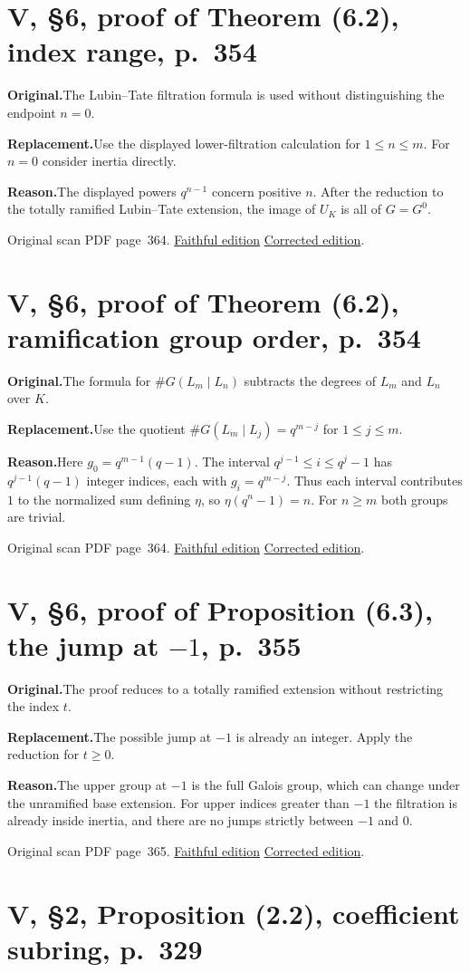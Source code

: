 \documentclass[11pt,a4paper]{article}
\newcommand{\original}{\par\smallskip\noindent\textbf{Original.}\enspace}
\newcommand{\replacement}{\par\smallskip\noindent\textbf{Replacement.}\enspace}
\newcommand{\reason}{\par\smallskip\noindent\textbf{Reason.}\enspace}
\newcommand{\editionlink}[3]{\href{#1\#errata.#2}{#3}}
\newcommand{\location}[2]{%
  \par\smallskip\noindent Original scan PDF page~#2.\enspace
  \editionlink{Neukirch_Faithful.pdf}{#1}{Faithful edition}
  \quad\editionlink{Neukirch_Corrected.pdf}{#1}{Corrected edition}.}
\begin{document}
\setcounter{section}{122}
\section{V, \S6, proof of Theorem (6.2), index range, p.~354}\label{errata:item:123}

\original The Lubin--Tate filtration formula is used without distinguishing the endpoint $n=0$.
\replacement Use the displayed lower-filtration calculation for $1\le n\le m$. For $n=0$ consider inertia directly.
\reason The displayed powers $q^{n-1}$ concern positive $n$. After the reduction to the totally ramified Lubin--Tate extension, the image of $U_K$ is all of $G=G^0$.
\location{123}{364}

\setcounter{section}{123}
\section{V, \S6, proof of Theorem (6.2), ramification group order, p.~354}\label{errata:item:124}

\original The formula for $\#G(L_m\mid L_n)$ subtracts the degrees of $L_m$ and $L_n$ over $K$.
\replacement Use the quotient $\#G(L_m\mid L_j)=q^{m-j}$ for $1\le j\le m$.
\reason Here $g_0=q^{m-1}(q-1)$. The interval $q^{j-1}\le i\le q^j-1$ has $q^{j-1}(q-1)$ integer indices, each with $g_i=q^{m-j}$. Thus each interval contributes $1$ to the normalized sum defining $\eta$, so $\eta(q^n-1)=n$. For $n\ge m$ both groups are trivial.
\location{124}{364}

\setcounter{section}{124}
\section{V, \S6, proof of Proposition (6.3), the jump at $-1$, p.~355}\label{errata:item:125}

\original The proof reduces to a totally ramified extension without restricting the index $t$.
\replacement The possible jump at $-1$ is already an integer. Apply the reduction for $t\ge0$.
\reason The upper group at $-1$ is the full Galois group, which can change under the unramified base extension. For upper indices greater than $-1$ the filtration is already inside inertia, and there are no jumps strictly between $-1$ and $0$.
\location{125}{365}

\setcounter{section}{125}
\section{V, \S2, Proposition (2.2), coefficient subring, p.~329}\label{errata:item:126}
\end{document}
